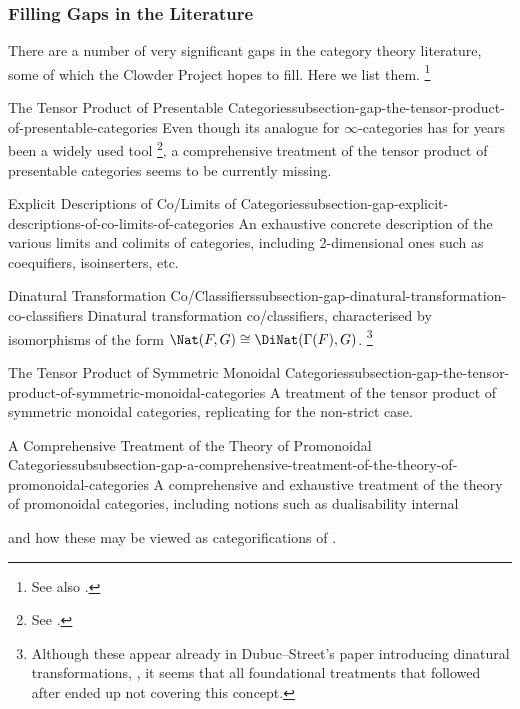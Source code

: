 \subsubsection{Filling Gaps in the Literature}\label{subsubsection-filling-gaps-in-the-literature}
There are a number of very significant gaps in the category theory literature, some of which the Clowder Project hopes to fill. Here we list them.%
\footnote{%
    See also \cite{MO494959}.
}%
\begin{gap}{The Tensor Product of Presentable Categories}{subsection-gap-the-tensor-product-of-presentable-categories}%
    Even though its analogue for $\infty$-categories has for years been a widely used tool%
    \footnote{%
        See \cite{MO490557}.
        \par\vspace*{\TCBBoxCorrection}
    }, %
    a comprehensive treatment of the tensor product of presentable categories seems to be currently missing.
\end{gap}
\begin{gap}{Explicit Descriptions of Co/Limits of Categories}{subsection-gap-explicit-descriptions-of-co-limits-of-categories}%
    An exhaustive concrete description of the various limits and colimits of categories, including 2-dimensional ones such as coequifiers, isoinserters, etc.
\end{gap}
\begin{gap}{Dinatural Transformation Co/Classifiers}{subsection-gap-dinatural-transformation-co-classifiers}%
    Dinatural transformation co/classifiers, characterised by isomorphisms of the form $\Nat(F,G)\cong\DiNat(\Gamma(F),G)$.%
    \footnote{%
        Although these appear already in Dubuc--Street's paper introducing dinatural transformations, \cite{dubuc-street-dinatural-transformations}, it seems that all foundational treatments that followed after ended up not covering this concept.
    }%
\end{gap}
\begin{gap}{The Tensor Product of Symmetric Monoidal Categories}{subsection-gap-the-tensor-product-of-symmetric-monoidal-categories}%
    A treatment of the tensor product of symmetric monoidal categories, replicating \cite{the-symmetric-monoidal-2-category-of-permutative-categories} for the non-strict case.
\end{gap}
\begin{gap}{A Comprehensive Treatment of the Theory of Promonoidal Categories}{subsubsection-gap-a-comprehensive-treatment-of-the-theory-of-promonoidal-categories}%
    A comprehensive and exhaustive treatment of the theory of promonoidal categories, including notions such as dualisability internal

    and how these may be viewed as categorifications of .
\end{gap}
